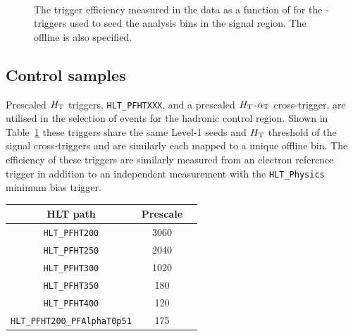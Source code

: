 \begin{figure}[h!]
\begin{center}
     ~~
    \caption{
      The trigger efficiency measured in the data as a function of \alt for the \scalht-\alt triggers used to seed the analysis bins in the signal region. The offline \scalht is also specified. 
    }
    \label{fig:alphat_turnons}
  \end{center} 
\end{figure}




\subsection{Control samples\label{sec:control_samples}}
Prescaled $\mbox{$H_\text{T}$}$ triggers, \verb!HLT_PFHTXXX!, and a prescaled 
$\mbox{$H_\text{T}$}$-$\alpha_{\text{T}}$ cross-trigger, are utilised in the 
selection of events for the hadronic control region. Shown 
in Table~\ref{tab:2015_Hadronic_Control_Triggers} these triggers share the same Level-1 
seeds and $\mbox{$H_\text{T}$}$ threshold of the signal cross-triggers and are similarly each mapped 
to a unique offline bin. The efficiency of these triggers are similarly measured from an electron 
reference trigger in addition to an independent measurement with the \verb!HLT_Physics! 
minimum bias trigger.


\begin{table}[h!]
\footnotesize
\centering
\begin{tabular}{c|cc} 
\hline
\hline
HLT path & \multicolumn{1}{c}{Prescale} \\
\hline
\texttt{HLT\_PFHT200} & 3060 \\
\texttt{HLT\_PFHT250} & 2040 \\
\texttt{HLT\_PFHT300} & 1020 \\
\texttt{HLT\_PFHT350} & 180  \\
\texttt{HLT\_PFHT400} & 120  \\
\texttt{HLT\_PFHT200\_PFAlphaT0p51} & 175 \\
\hline
\hline

\end{tabular}
\label{tab:2015_Hadronic_Control_Triggers}
\end{table}


